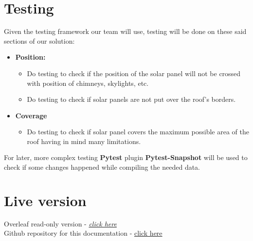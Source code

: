 \documentclass[a4paper,12pt,fleqn]{article}
\begin{document}
\newpage
\section{Testing}
Given the testing framework our team will use, testing will be done on these said sections of our solution:
\begin{itemize}
    \item \textbf{Position:}
    \begin{itemize}
        \item Do testing to check if the position of the solar panel will not be crossed with position of chimneys, skylights, etc.
        \item Do testing to check if solar panels are not put over the roof's borders.
    \end{itemize}
    \item \textbf{Coverage}
    \begin{itemize}
        \item Do testing to check if solar panel covers the maximum possible area of the roof having in mind many limitations.
    \end{itemize}
\end{itemize}
For later, more complex testing \textbf{Pytest} plugin \textbf{Pytest-Snapshot} will be used to check if some changes happened while compiling the needed data.

\newpage
\section{Live version}
\begin{center}
    Overleaf read-only version - \href{https://www.overleaf.com/read/zkbzrtthrfcd}{\textit{click here}}\\
    Github repository for this documentation - \href{https://github.com/Jamtit/Technical-Requirements-Team3}{click here}
\end{center}
\end{document}
